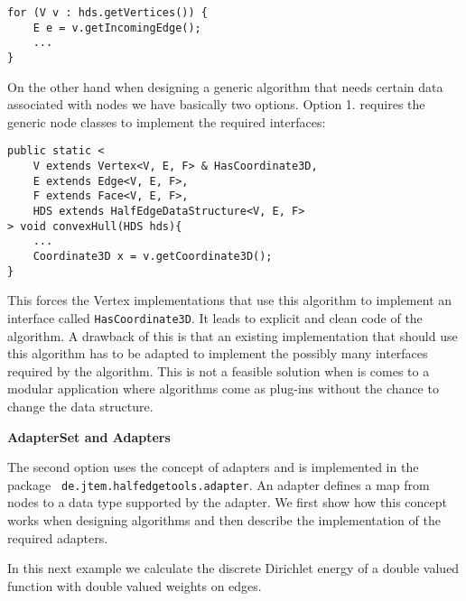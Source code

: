 \documentclass[Thesis.tex]{subfiles}
\begin{document}
\begin{lstlisting}
for (V v : hds.getVertices()) {
	E e = v.getIncomingEdge();
	...
}
\end{lstlisting}

On the other hand when designing a generic algorithm that needs certain data associated
with nodes we have basically two options. Option 1. requires the generic node classes to
implement the required interfaces:

\begin{lstlisting}
public static <
	V extends Vertex<V, E, F> & HasCoordinate3D,
	E extends Edge<V, E, F>,
	F extends Face<V, E, F>,
	HDS extends HalfEdgeDataStructure<V, E, F>
> void convexHull(HDS hds){
	...
	Coordinate3D x = v.getCoordinate3D();
}
\end{lstlisting}

This forces the Vertex implementations that use this algorithm to implement an interface
called {\tt HasCoordinate3D}. It leads to explicit and clean code of the algorithm. A drawback of this
is that an existing implementation that should use this algorithm has to be adapted to implement the 
possibly many interfaces required by the algorithm. 
This is not a feasible solution when is comes to a modular application where algorithms come as 
plug-ins without the chance to change the data structure.

{\bf AdapterSet and Adapters}

The second option uses the concept of adapters and is implemented in the package {\tt
de.jtem.\-halfedge\-tools.adapter}. An adapter defines a map from nodes to a data type supported 
by the adapter. We first show how this concept works when designing algorithms and then
describe the implementation of the required adapters. 

In this next example we calculate the discrete Dirichlet energy of a double valued function with 
double valued weights on edges. 


\end{document}
